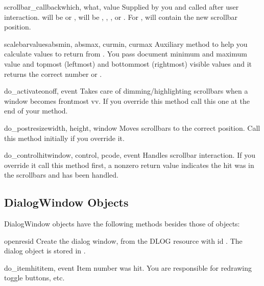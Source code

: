\begin{methoddesc}[ScrolledWindow]{scrollbar_callback}{which, what, value}
Supplied by you and called after user interaction.  will
be  or ,  will be ,
, ,  or . For
,  will contain the new scrollbar position.
\end{methoddesc}

\begin{methoddesc}[ScrolledWindow]{scalebarvalues}{absmin, absmax,
                                                   curmin, curmax}
Auxiliary method to help you calculate values to return from
. You pass document minimum and maximum value
and topmost (leftmost) and bottommost (rightmost) visible values and
it returns the correct number or .
\end{methoddesc}

\begin{methoddesc}[ScrolledWindow]{do_activate}{onoff, event}
Takes care of dimming/highlighting scrollbars when a window becomes
frontmost vv. If you override this method call this one at the end of
your method.
\end{methoddesc}

\begin{methoddesc}[ScrolledWindow]{do_postresize}{width, height, window}
Moves scrollbars to the correct position. Call this method initially
if you override it.
\end{methoddesc}

\begin{methoddesc}[ScrolledWindow]{do_controlhit}{window, control,
                                                  pcode, event}
Handles scrollbar interaction. If you override it call this method
first, a nonzero return value indicates the hit was in the scrollbars
and has been handled.
\end{methoddesc}


\subsection{DialogWindow Objects \label{dialogwindow-objects}}

DialogWindow objects have the following methods besides those of
 objects:


\begin{methoddesc}[DialogWindow]{open}{resid}
Create the dialog window, from the DLOG resource with id
. The dialog object is stored in .
\end{methoddesc}

\begin{methoddesc}[DialogWindow]{do_itemhit}{item, event}
Item number  was hit. You are responsible for redrawing
toggle buttons, etc.
\end{methoddesc}
